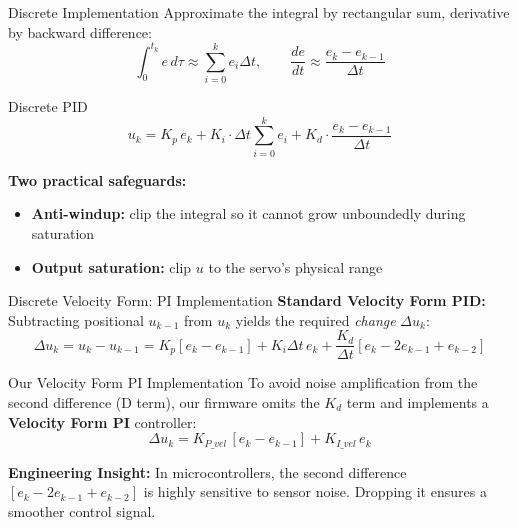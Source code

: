 \documentclass[10pt]{beamer}
\begin{document}
\begin{frame}{Discrete Implementation}
  Approximate the integral by rectangular sum, derivative by backward difference:
  \[
    \int_0^{t_k} e\,d\tau \approx \sum_{i=0}^{k} e_i \Delta t,
    \qquad
    \frac{de}{dt} \approx \frac{e_k - e_{k-1}}{\Delta t}
  \]

  \begin{block}{Discrete PID}
    \[
      u_k = K_p\, e_k + K_i \cdot \Delta t \sum_{i=0}^{k} e_i + K_d \cdot \frac{e_k - e_{k-1}}{\Delta t}
    \]
  \end{block}

  \textbf{Two practical safeguards:}
  \begin{itemize}
    \item \textbf{Anti-windup:} clip the integral so it cannot grow unboundedly during saturation
    \item \textbf{Output saturation:} clip $u$ to the servo's physical range
  \end{itemize}
\end{frame}



\begin{frame}{Discrete Velocity Form: PI Implementation}
  \textbf{Standard Velocity Form PID:}
  Subtracting positional $u_{k-1}$ from $u_k$ yields the required \textit{change} $\Delta u_k$:
  \[
    \Delta u_k = u_k - u_{k-1} = K_p[e_k - e_{k-1}] + K_i \Delta t \, e_k + \frac{K_d}{\Delta t}[e_k - 2e_{k-1} + e_{k-2}]
  \]

  \vspace{0.3cm}
  
  \begin{block}{Our Velocity Form PI Implementation}
    To avoid noise amplification from the second difference (D term), our firmware omits the $K_d$ term and implements a \textbf{Velocity Form PI} controller:
    \[
      \Delta u_k = K_{P\_vel}\,[e_k - e_{k-1}] + K_{I\_vel}\, e_k
    \]
  \end{block}
  
  \vspace{0.2cm}
  \footnotesize
  \textbf{Engineering Insight:} In microcontrollers, the second difference $[e_k - 2e_{k-1} + e_{k-2}]$ is highly sensitive to sensor noise. Dropping it ensures a smoother control signal.
\end{frame}
\end{document}
